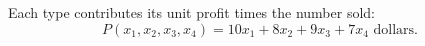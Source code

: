 Each type contributes its unit profit times the number sold:
\[\boxed{P(x_1,x_2,x_3,x_4)=10x_1+8x_2+9x_3+7x_4}\text{ dollars}.\]
